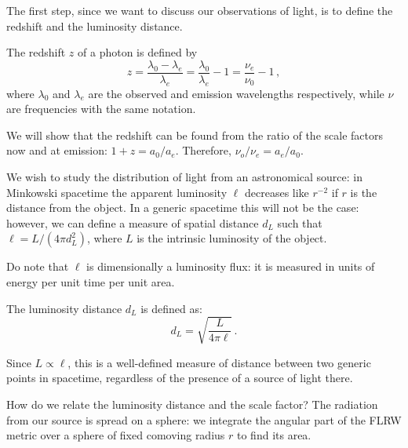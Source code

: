 \documentclass[main.tex]{subfiles}
\begin{document}
The first step, since we want to discuss our observations of light, is to define the redshift and the luminosity distance.

\begin{definition}[Redshift]
The redshift \(z\) of a photon is defined by
%
\begin{equation}
  z = \frac{\lambda_0 - \lambda_e}{\lambda_{e}}
  = \frac{\lambda_0 }{\lambda_{e}} - 1
  = \frac{\nu_{e}}{\nu_{0}} - 1
  \,,
\end{equation}
%
where \(\lambda_0\) and \(\lambda_e\) are the observed and emission wavelengths respectively, while \(\nu \) are frequencies with the same notation.
\end{definition}

We will show
that the redshift can be found from the ratio of the scale factors now and at emission: \(1+z = a_0/ a_e\).
Therefore, \(\nu_o / \nu_e = a_e / a_0\).

We wish to study the distribution of light from an astronomical source: in Minkowski spacetime the apparent luminosity \(\ell\) decreases like \(r^{-2}\) if \(r\) is the distance from the object.
In a generic spacetime this will not be the case: however, we can define a measure of spatial distance \(d_L\) such that \(\ell = L / (4 \pi d_L^2)\), where \(L\) is the intrinsic luminosity of the object.

Do note that \(\ell \) is dimensionally a luminosity flux: it is measured in units of energy per unit time per unit area.

\begin{definition}  
The luminosity distance \(d_L\) is defined as:
%
\begin{equation}
d_L = \sqrt{\frac{L}{4 \pi \ell} } \,.
\end{equation}

Since \(L \propto \ell\), this is a well-defined measure of distance between two generic points in spacetime, regardless of the presence of a source of light there.
\end{definition}
  
How do we relate the luminosity distance and the scale factor?
The radiation from our source is spread on a sphere: we integrate the angular part of the FLRW metric over a sphere of fixed comoving radius \(r\) to find its area.
\end{document}
